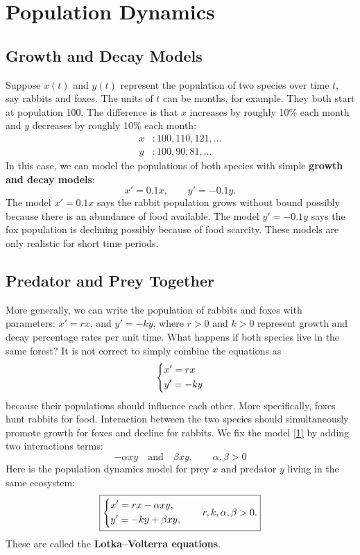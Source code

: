 \documentclass[10pt,letterpaper]{article}
\begin{document}

\section{Population Dynamics}

\subsection{Growth and Decay Models}
Suppose $x(t)$ and $y(t)$ represent the population of two species over time $t$, say rabbits and foxes. The units of $t$ can be months, for example. They both start at population 100. The difference is that $x$ increases by roughly 10\% each month and $y$ decreases by roughly 10\% each month: 
\begin{align*}
x&: 100, 110, 121,\dots\\
y&: 100, 90, 81,\dots 
\end{align*}
In this case, we can model the populations of both species with simple \textbf{growth and decay models}:
$$
    x' =0.1x,\qquad y'=-0.1y.
$$
The model $x'=0.1x$ says the rabbit population grows without bound possibly because there is an abundance of food available. The model $y'=-0.1y$ says the fox population is declining possibly because of food scarcity. These models are only realistic for short time periods. 

\subsection{Predator and Prey Together}

More generally, we can write the population of rabbits and foxes with parameters: $x' = rx$, and $y'=-ky$, where $r>0$ and $k>0$ represent growth and decay percentage rates per unit time. What happens if both species live in the same forest? It is not correct to simply combine the equations as 
\begin{equation} \label{1}    
\begin{dcases} 
    x' = rx\\
    y'= -ky
\end{dcases}
\end{equation}
because their populations should influence each other. More specifically, foxes hunt rabbits for food. Interaction between the two species should simultaneously promote growth for foxes and decline for rabbits. We fix the model \eqref{1} by adding two interactions terms:
$$
    -\alpha xy \quad\text{and}\quad \beta xy, \qquad \alpha,\beta>0
$$
Here is the population dynamics model for prey $x$ and predator $y$ living in the same ecosystem: 
\[
\boxed{
\begin{dcases}
x'=rx-\alpha xy,\\
y'=-ky+\beta xy,
\end{dcases}
\qquad r,k,\alpha,\beta>0.
}
\]
These are called the \textbf{Lotka–Volterra equations}.
\end{document}
